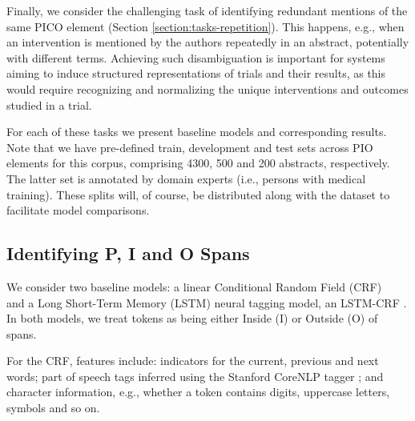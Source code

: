 \documentclass[11pt,a4paper]{article}
\begin{document}
Finally, we consider the challenging task of identifying redundant mentions of the same PICO element (Section \ref{section:tasks-repetition}). This happens, e.g., when an intervention is mentioned by the authors repeatedly in an abstract, potentially with different terms. Achieving such disambiguation is important for systems aiming to induce structured representations of trials and their results, as this would require recognizing and normalizing the unique interventions and outcomes studied in a trial.  








For each of these tasks we present baseline models and corresponding results. Note that we have pre-defined train, development and test sets across PIO elements for this corpus, comprising 4300, 500 and 200 abstracts, respectively. The latter set is annotated by domain experts (i.e., persons with medical training). These splits will, of course, be distributed along with the dataset to facilitate model comparisons.




\subsection{Identifying P, I and O Spans}
\label{section:tasks-spans}

We consider two baseline models: a linear Conditional Random Field (CRF) ~\cite{lafferty2001conditional} and a Long Short-Term Memory (LSTM) neural tagging model, an LSTM-CRF \cite{lample2016neural,ma-hovy:2016:P16-1}. In both models, we treat tokens as being either Inside (I) or Outside (O) of spans.  

For the CRF, features include: indicators for the current, previous and next words; part of speech tags inferred using the Stanford CoreNLP tagger \cite{DBLP:conf/acl/ManningSBFBM14}; and character information, e.g., whether a token contains digits, uppercase letters, symbols and so on.
\end{document}

